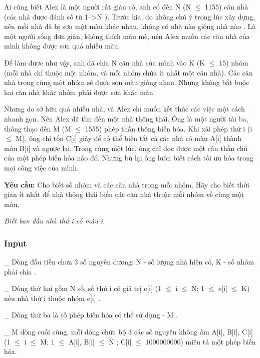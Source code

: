 



   Ai cũng biết Alex là một người rất giàu có, anh có đến   N (N $\le$ 1155)   căn nhà (các nhà được đánh số từ   1-->N   ). Trước kia, do không chú ý trong lúc xây dựng,   nên mỗi nhà đã bị sơn một màu khác nhau,   không có nhà nào giống nhà nào . Là một người sống đơn giản, không thích màu mè, nên Alex muốn các căn nhà của mình không được sơn quá nhiều màu.  

   Để làm đươc như vậy, anh đã chia   N   căn nhà của mình vào   \textbf{}K (K $\le$ 15)   nhóm (mỗi nhà chỉ thuộc một nhóm, và mỗi nhóm chứa ít nhất một căn nhà).   Các căn nhà trong cùng một nhóm sẽ được sơn màu giống nhau.   Nhưng không bắt buộc hai căn nhà khác nhóm phải được sơn khác màu.   \emph{
\\}

   Nhưng do sở hữu quá nhiều nhà, và Alex chỉ muốn kết thúc các việc một cách nhanh gọn. Nên Alex đã tìm đến một nhà thông thái. Ông là một người tài ba, thông thạo đến   M (M $\le$ 1555)   phép thần thông biến hóa. Khi xài phép thứ i (i $\le$ M), ông chỉ tốn C[i] giây để có thể   biến tất cả các nhà có màu A[i] thành màu B[i] và ngược lại.   Trong cùng một lúc, ông chỉ đọc được một câu thần chú của một phép biến hóa nào đó.      Nhưng bù lại ông luôn biết cách tối ưu hóa trong mọi công việc của mình.   \emph{
\\}

\textbf{    Yêu cầu:   }   Cho biết số nhóm và các căn nhà trong mỗi nhóm. Hãy cho biết thời gian ít nhất để nhà thông thái biến các căn nhà thuộc mỗi nhóm về cùng một màu.  

\emph{    Biết ban đầu nhà thứ i có màu i.    
\\}

\subsubsection{   Input  }

   \_ Dòng đầu tiến chưa 3 số nguyên dương:   N   - số lượng nhà hiện có,   K   - số nhóm phải chia   .

   \_ Dòng thứ hai gồm   N   số, số thứ i có giá trị   e[i] (1  $\le$  i  $\le$  N; 1  $\le$  e[i]  $\le$  K)   nếu nhà thứ i thuộc nhóm   e[i]   .  

   \_ Dòng thứ ba là số phép biến hóa có thể sử dụng -   M   .  

   \_ M dòng cuối cùng, mỗi dòng chứa bộ 3 các số nguyên không âm   A[i], B[i], C[i] (1  $\le$  i  $\le$  M; 1  $\le$  A[i], B[i]  $\le$  N ; C[i]  $\le$  1000000000)   miêu tả một phép biến hóa.  

